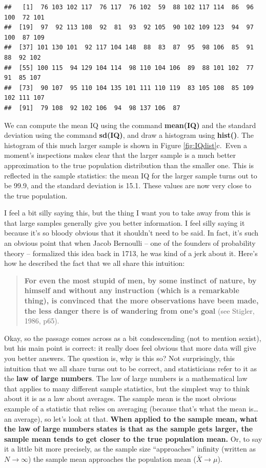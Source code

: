 \documentclass[
]{book}
\begin{document}
\begin{verbatim}
##   [1]  76 103 102 117  76 117  76 102  59  88 102 117 114  86  96 100  72 101
##  [19]  97  92 113 108  92  81  93  92 105  90 102 109 123  94  97 100  87 109
##  [37] 101 130 101  92 117 104 148  88  83  87  95  98 106  85  91  88  92 102
##  [55] 100 115  94 129 104 114  98 110 104 106  89  88 101 102  77  91  85 107
##  [73]  90 107  95 110 104 135 101 111 110 119  83 105 108  85 109 102 111 107
##  [91]  79 108  92 102 106  94  98 137 106  87
\end{verbatim}

We can compute the mean IQ using the command \textbf{mean(IQ)} and the standard deviation using the command \textbf{sd(IQ)}, and draw a histogram using \textbf{hist()}. The histogram of this much larger sample is shown in Figure \ref{fig:IQdist}c.~Even a moment's inspections makes clear that the larger sample is a much better approximation to the true population distribution than the smaller one. This is reflected in the sample statistics: the mean IQ for the larger sample turns out to be 99.9, and the standard deviation is 15.1. These values are now very close to the true population.

I feel a bit silly saying this, but the thing I want you to take away from this is that large samples generally give you better information. I feel silly saying it because it's so bloody obvious that it shouldn't need to be said. In fact, it's such an obvious point that when Jacob Bernoulli -- one of the founders of probability theory -- formalized this idea back in 1713, he was kind of a jerk about it. Here's how he described the fact that we all share this intuition:

\begin{quote}
\textbf{For even the most stupid of men, by some instinct of nature, by himself and without any instruction (which is a remarkable thing), is convinced that the more observations have been made, the less danger there is of wandering from one's goal} (see Stigler, 1986, p65).
\end{quote}

Okay, so the passage comes across as a bit condescending (not to mention sexist), but his main point is correct: it really does feel obvious that more data will give you better answers. The question is, why is this so? Not surprisingly, this intuition that we all share turns out to be correct, and statisticians refer to it as the \textbf{law of large numbers}. The law of large numbers is a mathematical law that applies to many different sample statistics, but the simplest way to think about it is as a law about averages. The sample mean is the most obvious example of a statistic that relies on averaging (because that's what the mean is\ldots{} an average), so let's look at that. \textbf{When applied to the sample mean, what the law of large numbers states is that as the sample gets larger, the sample mean tends to get closer to the true population mean.} Or, to say it a little bit more precisely, as the sample size ``approaches'' infinity (written as \(N \rightarrow \infty\)) the sample mean approaches the population mean (\(\bar{X} \rightarrow \mu\)).
\end{document}
